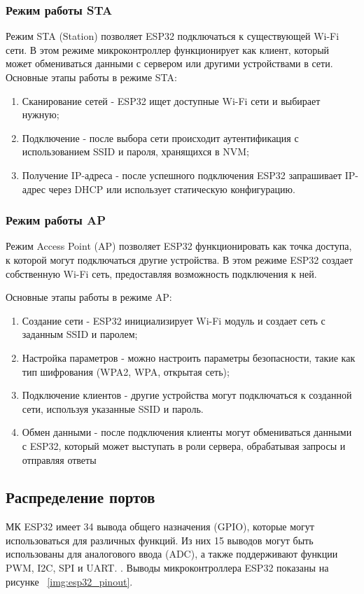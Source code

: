 \documentclass{bmstu}
\begin{document}
    \subsubsection{Режим работы STA}
    Режим STA (Station) позволяет ESP32 подключаться к существующей Wi-Fi сети. В этом режиме микроконтроллер функционирует как клиент, который может обмениваться данными с сервером или другими устройствами в сети.
    Основные этапы работы в режиме STA:
    \begin{enumerate}
        \item Сканирование сетей - ESP32 ищет доступные Wi-Fi сети и выбирает нужную;
        \item Подключение - после выбора сети происходит аутентификация с использованием SSID и пароля, хранящихся в NVM;
        \item Получение IP-адреса - после успешного подключения ESP32 запрашивает IP-адрес через DHCP или использует статическую конфигурацию.
    \end{enumerate}

    \subsubsection{Режим работы AP}
    Режим Access Point (AP) позволяет ESP32 функционировать как точка доступа, к которой могут подключаться другие устройства. В этом режиме ESP32 создает собственную Wi-Fi сеть, предоставляя возможность подключения к ней.

    Основные этапы работы в режиме AP:
    \begin{enumerate}
        \item Создание сети - ESP32 инициализирует Wi-Fi модуль и создает сеть с заданным SSID и паролем;
        \item Настройка параметров - можно настроить параметры безопасности, такие как тип шифрования (WPA2, WPA, открытая сеть);
        \item Подключение клиентов - другие устройства могут подключаться к созданной сети, используя указанные SSID и пароль.
        \item Обмен данными - после подключения клиенты могут обмениваться данными с ESP32, который может выступать в роли сервера, обрабатывая запросы и отправляя ответы
    \end{enumerate}


    \subsection{Распределение портов}
    МК ESP32 имеет 34 вывода общего назначения (GPIO), которые могут использоваться для различных функций. Из них 15 выводов могут быть использованы для аналогового ввода (ADC), а также поддерживают функции PWM, I2C, SPI и UART.
    . Выводы микроконтроллера ESP32 показаны на рисунке ~\ref{img:esp32_pinout}.
\end{document}

